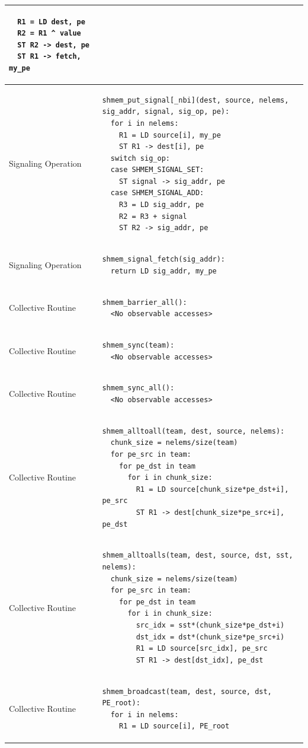 \begin{longtable}{|m{}|m{}|}
\begin{BVerbatim}
  R1 = LD dest, pe
  R2 = R1 ^ value
  ST R2 -> dest, pe
  ST R1 -> fetch, my_pe
    \end{BVerbatim}
    \tabularnewline\hline
Signaling Operation
    & \begin{BVerbatim}
shmem_put_signal[_nbi](dest, source, nelems,
sig_addr, signal, sig_op, pe):
  for i in nelems:
    R1 = LD source[i], my_pe
    ST R1 -> dest[i], pe
  switch sig_op:
  case SHMEM_SIGNAL_SET:
    ST signal -> sig_addr, pe
  case SHMEM_SIGNAL_ADD:
    R3 = LD sig_addr, pe
    R2 = R3 + signal
    ST R2 -> sig_addr, pe
    \end{BVerbatim}
    \tabularnewline\hline
Signaling Operation
    & \begin{BVerbatim}
shmem_signal_fetch(sig_addr):
  return LD sig_addr, my_pe
    \end{BVerbatim}
    \tabularnewline\hline
Collective Routine
    & \begin{BVerbatim}
shmem_barrier_all():
  <No observable accesses>
    \end{BVerbatim}
    \tabularnewline\hline
Collective Routine
    & \begin{BVerbatim}
shmem_sync(team):
  <No observable accesses>
    \end{BVerbatim}
    \tabularnewline\hline
Collective Routine
    & \begin{BVerbatim}
shmem_sync_all():
  <No observable accesses>
    \end{BVerbatim}
    \tabularnewline\hline
Collective Routine
    & \begin{BVerbatim}
shmem_alltoall(team, dest, source, nelems):
  chunk_size = nelems/size(team)
  for pe_src in team:
    for pe_dst in team
      for i in chunk_size:
        R1 = LD source[chunk_size*pe_dst+i], pe_src
        ST R1 -> dest[chunk_size*pe_src+i], pe_dst
    \end{BVerbatim}
    \tabularnewline\hline
Collective Routine
    & \begin{BVerbatim}
shmem_alltoalls(team, dest, source, dst, sst,
nelems):
  chunk_size = nelems/size(team)
  for pe_src in team:
    for pe_dst in team
      for i in chunk_size:
        src_idx = sst*(chunk_size*pe_dst+i)
        dst_idx = dst*(chunk_size*pe_src+i)
        R1 = LD source[src_idx], pe_src
        ST R1 -> dest[dst_idx], pe_dst
    \end{BVerbatim}
    \tabularnewline\hline
Collective Routine
    & \begin{BVerbatim}
shmem_broadcast(team, dest, source, dst, PE_root):
  for i in nelems:
    R1 = LD source[i], PE_root

\end{BVerbatim}
\end{longtable}
